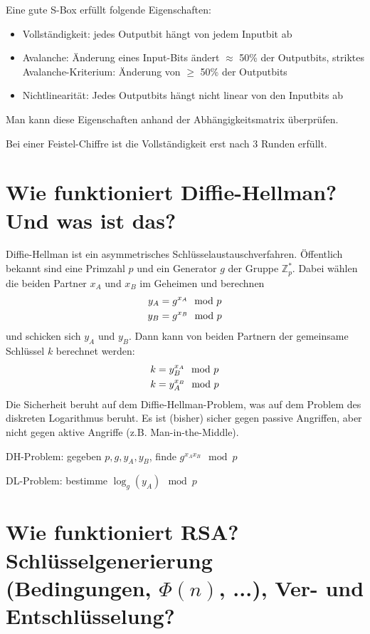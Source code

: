 \documentclass{article}
\begin{document}
	Eine gute S-Box erfüllt folgende Eigenschaften:
	\begin{itemize}
		\item Vollständigkeit: jedes Outputbit hängt von jedem Inputbit ab
		\item Avalanche: Änderung eines Input-Bits ändert $\approx$ 50\% der Outputbits, striktes Avalanche-Kriterium: Änderung von $\ge$ 50\% der Outputbits
		\item Nichtlinearität: Jedes Outputbits hängt nicht linear von den Inputbits ab
	\end{itemize}
	Man kann diese Eigenschaften anhand der Abhängigkeitsmatrix überprüfen.

	Bei einer Feistel-Chiffre ist die Vollständigkeit erst nach 3 Runden erfüllt.
	
	\section*{Wie funktioniert Diffie-Hellman? Und was ist das?}
	
	Diffie-Hellman ist ein asymmetrisches Schlüsselaustauschverfahren. Öffentlich bekannt sind eine Primzahl $p$ und ein Generator $g$ der Gruppe $\mathbb{Z}_p^\ast$. Dabei wählen die beiden Partner $x_A$ und $x_B$ im Geheimen und berechnen
	\begin{align}
		y_A &= g^{x_A} \mod p \notag \\
		y_B &= g^{x_B} \mod p \notag
	\end{align}
	und schicken sich $y_A$ und $y_B$. Dann kann von beiden Partnern der gemeinsame Schlüssel $k$ berechnet werden:
	\begin{align}
		k &= y_B^{x_A} \mod p \notag \\
		k &= y_A^{x_B} \mod p \notag
	\end{align}
	Die Sicherheit beruht auf dem Diffie-Hellman-Problem, was auf dem Problem des diskreten Logarithmus beruht. Es ist (bisher) sicher gegen passive Angriffen, aber nicht gegen aktive Angriffe (z.B. Man-in-the-Middle).
	
	DH-Problem: gegeben $p,g,y_A,y_B$, finde $g^{x_Ax_B} \mod p$
	
	DL-Problem: bestimme $\log_g(y_A)\mod p$
	
	\section*{Wie funktioniert RSA? Schlüsselgenerierung (Bedingungen, $\Phi(n)$, ...), Ver- und Entschlüsselung?}
	
\end{document}
